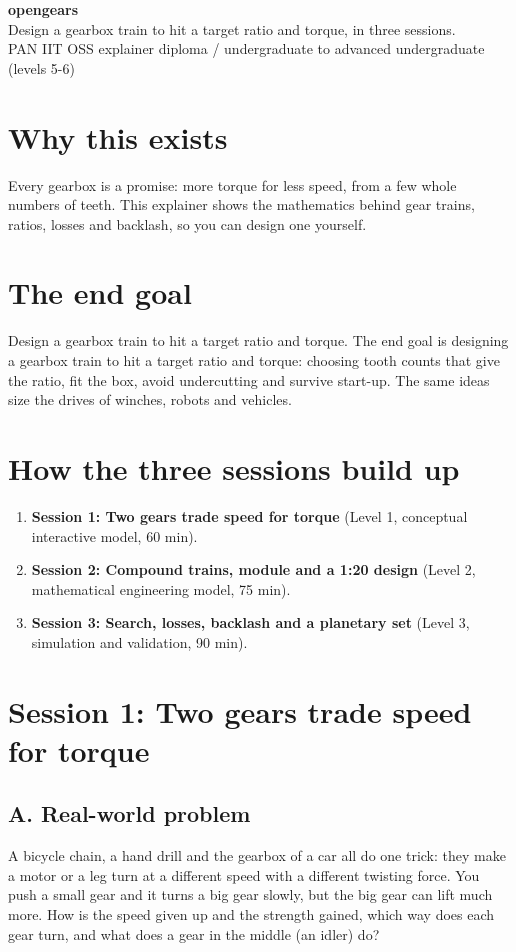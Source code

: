 \documentclass[11pt,a4paper]{article}
\begin{document}
\begin{center}{\LARGE\bfseries opengears}\\[0.4em]{\large Design a gearbox train to hit a target ratio and torque, in three sessions.}\\[0.2em]\small PAN IIT OSS explainer \textbullet{} diploma / undergraduate to advanced undergraduate (levels 5-6)\end{center}

\section*{Why this exists}
Every gearbox is a promise: more torque for less speed, from a few whole numbers of teeth. This explainer shows the mathematics behind gear trains, ratios, losses and backlash, so you can design one yourself.

\section*{The end goal}
Design a gearbox train to hit a target ratio and torque. The end goal is designing a gearbox train to hit a target ratio and torque: choosing tooth counts that give the ratio, fit the box, avoid undercutting and survive start-up. The same ideas size the drives of winches, robots and vehicles.

\section*{How the three sessions build up}
\begin{enumerate}[nosep]
\item \textbf{Session 1: Two gears trade speed for torque} (Level 1, conceptual interactive model, 60 min).
\item \textbf{Session 2: Compound trains, module and a 1:20 design} (Level 2, mathematical engineering model, 75 min).
\item \textbf{Session 3: Search, losses, backlash and a planetary set} (Level 3, simulation and validation, 90 min).
\end{enumerate}

\section{Session 1: Two gears trade speed for torque}

\subsection*{A. Real-world problem}
A bicycle chain, a hand drill and the gearbox of a car all do one trick: they make a motor or a leg turn at a different speed with a different twisting force. You push a small gear and it turns a big gear slowly, but the big gear can lift much more. How is the speed given up and the strength gained, which way does each gear turn, and what does a gear in the middle (an idler) do?
\end{document}
